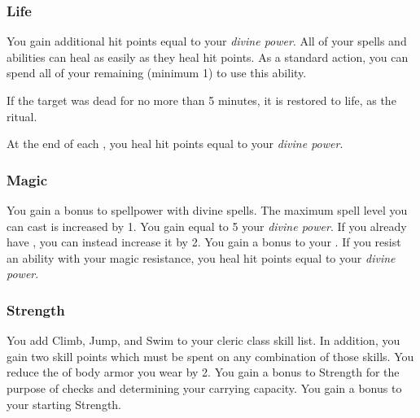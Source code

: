         \subsubsection{Life}
             You gain additional hit points equal to your \textit{divine power}.
             All of your  spells and abilities can heal  as easily as they heal hit points.
             As a standard action, you can spend all of your remaining  (minimum 1) to use this ability.
            \begin{ability}
                \begin{spelltargetinginfo}
                \end{spelltargetinginfo}
                \begin{spelleffects}
                    \spelleffect If the target was dead for no more than 5 minutes, it is restored to life, as the  ritual.
                \end{spelleffects}
            \end{ability}
             At the end of each , you heal hit points equal to your \textit{divine power}.

        \subsubsection{Magic}
             You gain a  bonus to spellpower with divine spells.
             The maximum spell level you can cast is increased by 1.
             You gain  equal to 5 \add your \textit{divine power}.
            If you already have , you can instead increase it by 2.
             You gain a  bonus to your .
            If you resist an ability with your magic resistance, you heal hit points equal to your \textit{divine power}.

        \subsubsection{Strength}
             You add Climb, Jump, and Swim to your cleric class skill list.
            In addition, you gain two skill points which must be spent on any combination of those skills.
             You reduce the  of body armor you wear by 2.
             You gain a  bonus to Strength for the purpose of checks and determining your carrying capacity.
             You gain a  bonus to your starting Strength.

